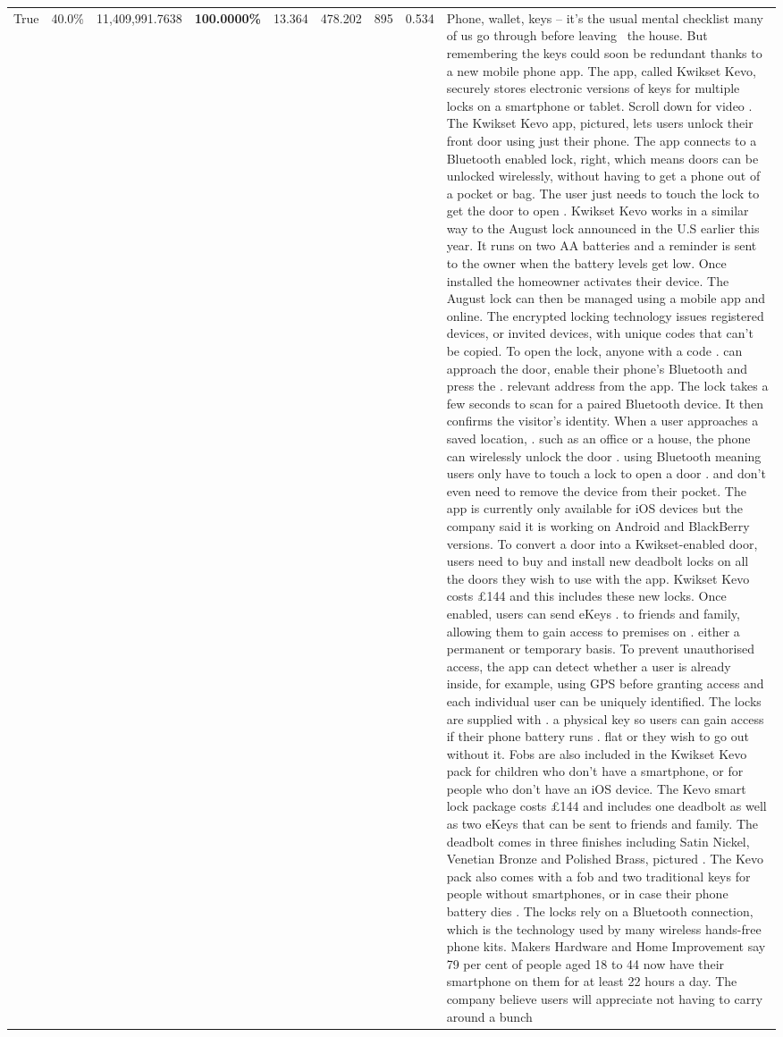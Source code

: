 \begin{table}[H]
\begin{tabular}{lllrlllll}
True & 40.0\% & 11,409,991.7638 & \bfseries \color{red} 100.0000\% & 13.364 & 478.202 & 895 & 0.534 & Phone, wallet, keys – it’s the usual mental checklist many of us go through before leaving  the house. But remembering the keys could soon be redundant thanks to a new mobile phone app. The app, called Kwikset Kevo, securely stores electronic versions of keys for multiple locks on a smartphone or tablet. Scroll down for video . The Kwikset Kevo app, pictured, lets users unlock their front door using just their phone. The app connects to a Bluetooth enabled lock, right, which means doors can be unlocked wirelessly, without having to get a phone out of a pocket or bag. The user just needs to touch the lock to get the door to open . Kwikset Kevo works in a similar way to the August lock announced in the U.S earlier this year. It runs on two AA batteries and a reminder is sent to the owner when the battery levels get low. Once installed the homeowner activates their device. The August lock can then be managed using a mobile app and online. The encrypted locking technology issues registered devices, or invited devices, with unique codes that can't be copied. To open the lock, anyone with a code . can approach the door, enable their phone's Bluetooth and press the . relevant address from the app. The lock takes a few seconds to scan for a paired Bluetooth device. It then confirms the visitor's identity. When a user approaches a saved location, . such as an office or a house, the phone can wirelessly unlock the door . using Bluetooth meaning users only have to touch a lock to open a door . and don't even need to remove the device from their pocket. The app is currently only available for iOS devices but the company said it is working on Android and BlackBerry versions. To convert a door into a Kwikset-enabled door, users need to buy and install new deadbolt locks on all the doors they wish to use with the app. Kwikset Kevo costs £144 and this includes these new locks. Once enabled, users can send eKeys . to friends and family, allowing them to gain access to premises on . either a permanent or temporary basis. To prevent unauthorised access, the app can detect whether a user is already inside, for example, using GPS before granting access and each individual user can be uniquely identified. The locks are supplied with . a physical key so users can gain access if their phone battery runs . flat or they wish to go out without it. Fobs are also included in the Kwikset Kevo pack for children who don't have a smartphone, or for people who don't have an iOS device. The Kevo smart lock package costs £144 and includes one deadbolt as well as two eKeys that can be sent to friends and family. The deadbolt comes in three finishes including Satin Nickel, Venetian Bronze and Polished Brass, pictured . The Kevo pack also comes with a fob and two traditional keys for people without smartphones, or in case their phone battery dies . The locks rely on a Bluetooth connection, which is the technology used by many wireless hands-free phone kits. Makers Hardware and Home Improvement say 79 per cent of people aged 18 to 44 now have their smartphone on them for at least 22 hours a day. The company believe users will appreciate not having to carry around a bunch 
\end{tabular}
\end{table}
